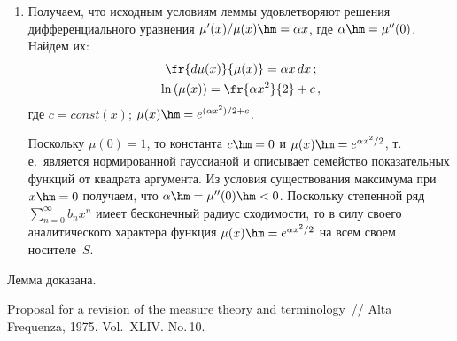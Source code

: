 \begin{multicols}{2}
{\begin{enumerate}[1.]
  Значит, 
  \begin{multline*}
  q_{n+2}= \fr{\mu^{(n+3)}(0)}{(n+2)!}- \mu^{\prime\prime}(0)
  \fr{\mu^{(n+1)}(0)}{(n+1)!}={}\\
  {}= \fr{{\mu^{\prime\prime}}^{(n+1)/2+1}(0)}{(n+2)!} 
\prod\limits_{j=0}^{(n+1)/2}(2j+1)- {}\\
{}-
\fr{{\mu^{\prime\prime}}^{(n+1)/2+1}(0)}{(n+1)!} \prod\limits_{j=0}^{(n-1)/2} 
(2j+1) ={}\\
  {}= \left( 2\fr{n+1}{2}+1\right) 
\fr{{\mu^{\prime\prime}}^{(n+1)/2+1}(0)}{(n+2)!} \prod\limits_{j=0}^{(n-1)/2} 
(2j+1)-{}\\
{}- \fr{{\mu^{\prime\prime}}^{(n+1)/2+1}(0)}{(n+1)!} 
  \prod\limits_{j=0}^{(n-1)/2} (2j+1)=0\,.
  \end{multline*}
  Таким образом, методом математической индукции показано, что все 
коэффициенты~$q_n$ разложения в ряд Маклорена функции $h(x)\hm= 
\mu^\prime(x)/\mu(x)$ с индексами $n\hm\geq 2$ будут нулевыми.
  \item  Получаем, что исходным условиям леммы удовле\-тво\-ря\-ют решения 
дифференциального уравнения $\mu^\prime(x)/\mu(x)\hm=\alpha x$, где 
$\alpha\hm= \mu^{\prime\prime}(0)$. Найдем их:
  \begin{gather*}
  \fr{d\mu(x)}{\mu(x)}=\alpha x \,dx\,;\\
  \ln \left( \mu(x)\right) =\fr{\alpha x^2}{2}+c\,,
  \end{gather*}
  где $c=const(x)$;  $\mu(x)\hm= e^{(\alpha x^2)/2+c}$.

     
     Поскольку $\mu(0)=1$, то константа $c\hm=0$ и $\mu(x)\hm= e^{\alpha 
x^2/2}$, т.\,е.\ является нормированной гауссианой и описывает семейство 
показательных функций от квадрата аргумента. Из условия существования 
максимума при $x\hm=0$ получаем, что 
$\alpha\hm=\mu^{\prime\prime}(0)\hm<0$. Поскольку степенной ряд 
$\sum\limits_{n=0}^\infty b_n x^n$ имеет бесконечный радиус схо\-ди\-мости, то в 
силу своего аналитического характера функция $\mu(x)\hm= e^{\alpha x^2/2}$ 
на всем своем носителе~$S$.
     \end{enumerate}
     
  Лемма доказана.
  
  }
  
  {\small\frenchspacing
{%
\begin{thebibliography}{99}
    

Proposal for a revision of the measure theory and terminology~// Alta Frequenza, 
1975. Vol.~XLIV. No.\,10.


\end{thebibliography}}}
\end{multicols}
